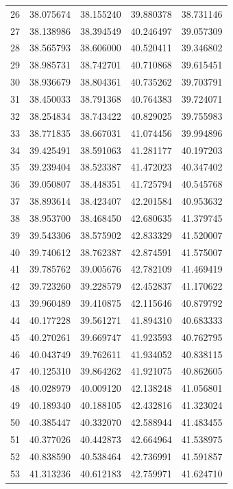 \begin{table}
\begin{tabular}{rrrrr}
26 & 38.075674 & 38.155240 & 39.880378 & 38.731146 \\
27 & 38.138986 & 38.394549 & 40.246497 & 39.057309 \\
28 & 38.565793 & 38.606000 & 40.520411 & 39.346802 \\
29 & 38.985731 & 38.742701 & 40.710868 & 39.615451 \\
30 & 38.936679 & 38.804361 & 40.735262 & 39.703791 \\
31 & 38.450033 & 38.791368 & 40.764383 & 39.724071 \\
32 & 38.254834 & 38.743422 & 40.829025 & 39.755983 \\
33 & 38.771835 & 38.667031 & 41.074456 & 39.994896 \\
34 & 39.425491 & 38.591063 & 41.281177 & 40.197203 \\
35 & 39.239404 & 38.523387 & 41.472023 & 40.347402 \\
36 & 39.050807 & 38.448351 & 41.725794 & 40.545768 \\
37 & 38.893614 & 38.423407 & 42.201584 & 40.953632 \\
38 & 38.953700 & 38.468450 & 42.680635 & 41.379745 \\
39 & 39.543306 & 38.575902 & 42.833329 & 41.520007 \\
40 & 39.740612 & 38.762387 & 42.874591 & 41.575007 \\
41 & 39.785762 & 39.005676 & 42.782109 & 41.469419 \\
42 & 39.723260 & 39.228579 & 42.452837 & 41.170622 \\
43 & 39.960489 & 39.410875 & 42.115646 & 40.879792 \\
44 & 40.177228 & 39.561271 & 41.894310 & 40.683333 \\
45 & 40.270261 & 39.669747 & 41.923593 & 40.762795 \\
46 & 40.043749 & 39.762611 & 41.934052 & 40.838115 \\
47 & 40.125310 & 39.864262 & 41.921075 & 40.862605 \\
48 & 40.028979 & 40.009120 & 42.138248 & 41.056801 \\
49 & 40.189340 & 40.188105 & 42.432816 & 41.323024 \\
50 & 40.385447 & 40.332070 & 42.588944 & 41.483455 \\
51 & 40.377026 & 40.442873 & 42.664964 & 41.538975 \\
52 & 40.838590 & 40.538464 & 42.736991 & 41.591857 \\
53 & 41.313236 & 40.612183 & 42.759971 & 41.624710 \\

\end{tabular}
\end{table}
